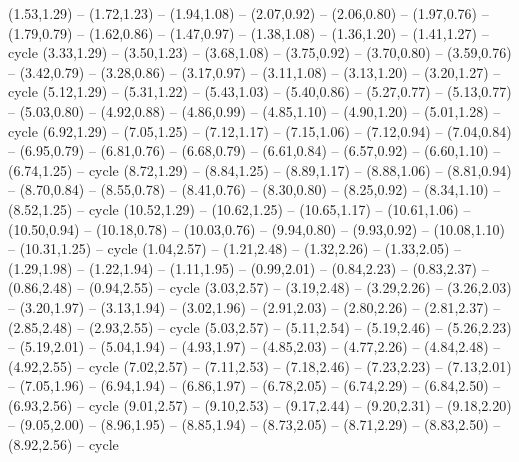 \providecommand\Tissot[1]{\csname geo:Tissot:#1\endcsname}
\def\TissotListe{k1,k2,k3,k4,k5,k6,k7,k8,k9,k10,k11,k12,k13,k14,k15,k16,k17,k18,k19,k20,k21,k22,k23,k24,k25,k26,k27,k28,k29,k30}
\expandafter\def\csname geo:Tissot:k1\endcsname{
  (1.53,1.29) -- (1.72,1.23) -- (1.94,1.08) -- (2.07,0.92) -- (2.06,0.80) -- (1.97,0.76) -- (1.79,0.79) -- (1.62,0.86) -- (1.47,0.97) -- (1.38,1.08) -- (1.36,1.20) -- (1.41,1.27) -- cycle}
\expandafter\def\csname geo:Tissot:k2\endcsname{
  (3.33,1.29) -- (3.50,1.23) -- (3.68,1.08) -- (3.75,0.92) -- (3.70,0.80) -- (3.59,0.76) -- (3.42,0.79) -- (3.28,0.86) -- (3.17,0.97) -- (3.11,1.08) -- (3.13,1.20) -- (3.20,1.27) -- cycle}
\expandafter\def\csname geo:Tissot:k3\endcsname{
  (5.12,1.29) -- (5.31,1.22) -- (5.43,1.03) -- (5.40,0.86) -- (5.27,0.77) -- (5.13,0.77) -- (5.03,0.80) -- (4.92,0.88) -- (4.86,0.99) -- (4.85,1.10) -- (4.90,1.20) -- (5.01,1.28) -- cycle}
\expandafter\def\csname geo:Tissot:k4\endcsname{
  (6.92,1.29) -- (7.05,1.25) -- (7.12,1.17) -- (7.15,1.06) -- (7.12,0.94) -- (7.04,0.84) -- (6.95,0.79) -- (6.81,0.76) -- (6.68,0.79) -- (6.61,0.84) -- (6.57,0.92) -- (6.60,1.10) -- (6.74,1.25) -- cycle}
\expandafter\def\csname geo:Tissot:k5\endcsname{
  (8.72,1.29) -- (8.84,1.25) -- (8.89,1.17) -- (8.88,1.06) -- (8.81,0.94) -- (8.70,0.84) -- (8.55,0.78) -- (8.41,0.76) -- (8.30,0.80) -- (8.25,0.92) -- (8.34,1.10) -- (8.52,1.25) -- cycle}
\expandafter\def\csname geo:Tissot:k6\endcsname{
  (10.52,1.29) -- (10.62,1.25) -- (10.65,1.17) -- (10.61,1.06) -- (10.50,0.94) -- (10.18,0.78) -- (10.03,0.76) -- (9.94,0.80) -- (9.93,0.92) -- (10.08,1.10) -- (10.31,1.25) -- cycle}
\expandafter\def\csname geo:Tissot:k7\endcsname{
  (1.04,2.57) -- (1.21,2.48) -- (1.32,2.26) -- (1.33,2.05) -- (1.29,1.98) -- (1.22,1.94) -- (1.11,1.95) -- (0.99,2.01) -- (0.84,2.23) -- (0.83,2.37) -- (0.86,2.48) -- (0.94,2.55) -- cycle}
\expandafter\def\csname geo:Tissot:k8\endcsname{
  (3.03,2.57) -- (3.19,2.48) -- (3.29,2.26) -- (3.26,2.03) -- (3.20,1.97) -- (3.13,1.94) -- (3.02,1.96) -- (2.91,2.03) -- (2.80,2.26) -- (2.81,2.37) -- (2.85,2.48) -- (2.93,2.55) -- cycle}
\expandafter\def\csname geo:Tissot:k9\endcsname{
  (5.03,2.57) -- (5.11,2.54) -- (5.19,2.46) -- (5.26,2.23) -- (5.19,2.01) -- (5.04,1.94) -- (4.93,1.97) -- (4.85,2.03) -- (4.77,2.26) -- (4.84,2.48) -- (4.92,2.55) -- cycle}
\expandafter\def\csname geo:Tissot:k10\endcsname{
  (7.02,2.57) -- (7.11,2.53) -- (7.18,2.46) -- (7.23,2.23) -- (7.13,2.01) -- (7.05,1.96) -- (6.94,1.94) -- (6.86,1.97) -- (6.78,2.05) -- (6.74,2.29) -- (6.84,2.50) -- (6.93,2.56) -- cycle}
\expandafter\def\csname geo:Tissot:k11\endcsname{
  (9.01,2.57) -- (9.10,2.53) -- (9.17,2.44) -- (9.20,2.31) -- (9.18,2.20) -- (9.05,2.00) -- (8.96,1.95) -- (8.85,1.94) -- (8.73,2.05) -- (8.71,2.29) -- (8.83,2.50) -- (8.92,2.56) -- cycle}
